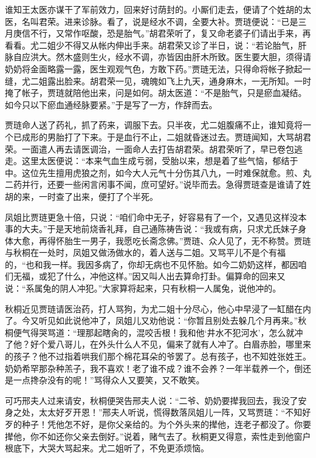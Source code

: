 \documentclass[12pt,oneside]{book}
\begin{document}
谁知王太医亦谋干了军前效力，回来好讨荫封的。小厮们走去，便请了个姓胡的太医，名叫君荣。进来诊脉。看了，说是经水不调，全要大补。贾琏便说：“已是三月庚信不行，又常作呕酸，恐是胎气。”胡君荣听了，复又命老婆子们请出手来，再看看。尤二姐少不得又从帐内伸出手来。胡君荣又诊了半日，说：“若论胎气，肝脉自应洪大。然木盛则生火，经水不调，亦皆因由肝木所致。医生要大胆，须得请奶奶将金面略露一露，医生观观气色，方敢下药。”贾琏无法，只得命将帐子掀起一缝，尤二姐露出脸来。胡君荣一见，魂魄如飞上九天，通身麻木，一无所知。一时掩了帐子，贾琏就陪他出来，问是如何。胡太医道：“不是胎气，只是瘀血凝结。如今只以下瘀血通经脉要紧。”于是写了一方，作辞而去。

贾琏命人送了药礼，抓了药来，调服下去。只半夜，尤二姐腹痛不止，谁知竟将一个已成形的男胎打了下来。于是血行不止，二姐就昏迷过去。贾琏闻知，大骂胡君荣。一面遣人再去请医调治，一面命人去打告胡君荣。胡君荣听了，早已卷包逃走。这里太医便说：“本来气血生成亏弱，受胎以来，想是着了些气恼，郁结于中。这位先生擅用虎狼之剂，如今大人元气十分伤其八九，一时难保就愈。煎、丸二药并行，还要一些闲言闲事不闻，庶可望好。”说毕而去。急得贾琏查是谁请了姓胡的来，一时查了出来，便打了个半死。

凤姐比贾琏更急十倍，只说：“咱们命中无子，好容易有了一个，又遇见这样没本事的大夫。”于是天地前烧香礼拜，自己通陈祷告说：“我或有病，只求尤氏妹子身体大愈，再得怀胎生一男子，我愿吃长斋念佛。”贾琏、众人见了，无不称赞。贾琏与秋桐在一处时，凤姐又做汤做水的，着人送与二姐。又骂平儿不是个有福的，“也和我一样。我因多病了，你却无病也不见怀胎。如今二奶奶这样，都因咱们无福，或犯了什么，冲他这样。”因又叫人出去算命打卦。偏算命的回来又说：“系属兔的阴人冲犯。”大家算将起来，只有秋桐一人属兔，说他冲的。

秋桐近见贾琏请医治药，打人骂狗，为尤二姐十分尽心，他心中早浸了一缸醋在内了。今又听见如此说他冲了，凤姐儿又劝他说：“你暂且别处去躲几个月再来。”秋桐便气得哭骂道：“理那起瞎肏的，混咬舌根！我和他‘井水不犯河水’，怎么就冲了他？好个爱八哥儿，在外头什么人不见，偏来了就有人冲了。白眉赤脸，哪里来的孩子？他不过指着哄我们那个棉花耳朵的爷罢了。总有孩子，也不知姓张姓王。奶奶希罕那杂种羔子，我不喜欢！老了谁不成？谁不会养？一年半载养一个，倒还是一点搀杂没有的呢！”骂得众人又要笑，又不敢笑。

可巧邢夫人过来请安，秋桐便哭告邢夫人说：“二爷、奶奶要撵我回去，我没了安身之处，太太好歹开恩！”邢夫人听说，慌得数落凤姐儿一阵，又骂贾琏：“不知好歹的种子！凭他怎不好，是你父亲给的。为个外头来的撵他，连老子都没了。你要撵他，你不如还你父亲去倒好。”说着，赌气去了。秋桐更又得意，索性走到他窗户根底下，大哭大骂起来。尤二姐听了，不免更添烦恼。
\end{document}
